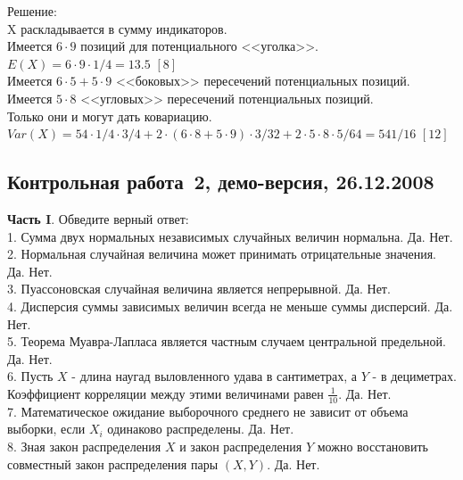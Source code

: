 \documentclass[pdftex,12pt,a4paper]{article}
\begin{document}
Решение: \\
X раскладывается в сумму индикаторов.\\
Имеется $6\cdot9$ позиций для потенциального <<уголка>>. \\
$E(X)=6\cdot9\cdot1/4=13.5$ $[8]$ \\
Имеется $6\cdot5+5\cdot9$ <<боковых>> пересечений потенциальных позиций. \\
Имеется $5\cdot8$ <<угловых>> пересечений потенциальных позиций. \\
Только они и могут дать ковариацию. \\
$Var(X)=54\cdot1/4\cdot3/4+2\cdot(6\cdot8+5\cdot9)\cdot3/32+2\cdot5\cdot8\cdot5/64=541/16$ $[12]$\\



\subsection{Контрольная работа \No\,2, демо-версия, 26.12.2008}

\textbf{Часть I}. Обведите верный ответ: \\

1. Сумма двух нормальных независимых случайных величин нормальна.
Да. Нет. \\

2. Нормальная случайная величина может принимать отрицательные
значения. Да. Нет. \\

3. Пуассоновская случайная величина является непрерывной. Да. Нет.
\\

4. Дисперсия суммы зависимых величин всегда не меньше суммы
дисперсий. Да. Нет. \\

5. Теорема Муавра-Лапласа является частным случаем центральной
предельной. Да. Нет. \\

6. Пусть $X$ - длина наугад выловленного удава в сантиметрах, а
$Y$ - в дециметрах. Коэффициент корреляции между этими
величинами равен $\frac{1}{10}$. Да. Нет. \\

7. Математическое ожидание выборочного среднего не зависит от
объема выборки, если $X_{i}$ одинаково распределены. Да. Нет. \\

8. Зная закон распределения $X$ и закон распределения $Y$
можно восстановить совместный закон распределения пары $(X,Y)$. Да. Нет. \\
\end{document}
